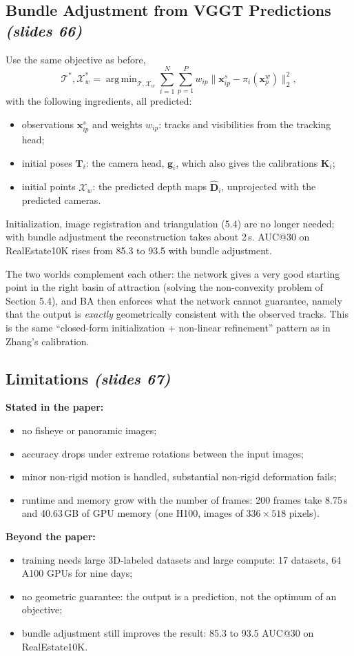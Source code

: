\documentclass[11pt,a4paper]{article}
\newcommand{\slr}[1]{\texorpdfstring{\emph{(slides #1)}}{(slides #1)}}
\DeclareMathOperator*{\argmin}{arg\,min}
\theoremstyle{definition}
\theoremstyle{plain}
\theoremstyle{remark}
\begin{document}
\subsection{Bundle Adjustment from VGGT Predictions \slr{66}}
Use the same objective as before,
\[
\mathcal T^*,\mathcal X_w^*=\argmin_{\mathcal T,\mathcal X_w}\sum_{i=1}^N\sum_{p=1}^P w_{ip}\bigl\lVert\bm x^s_{ip}-\pi_i(\bm x^w_p)\bigr\rVert_2^2,
\]
with the following ingredients, all predicted:
\begin{itemize}
\item observations $\bm x^s_{ip}$ and weights $w_{ip}$: tracks and visibilities from the tracking head;
\item initial poses $\bm T_i$: the camera head, $\hat{\bm g}_i$, which also gives the calibrations $\bm K_i$;
\item initial points $\mathcal X_w$: the predicted depth maps $\hat{\bm D}_i$, unprojected with the predicted cameras.
\end{itemize}
Initialization, image registration and triangulation (5.4) are no longer needed; with bundle adjustment the reconstruction takes about 2\,s. AUC@30 on RealEstate10K rises from 85.3 to 93.5 with bundle adjustment.

\begin{intuition}
The two worlds complement each other: the network gives a very good starting point in the right basin of attraction (solving the non-convexity problem of Section 5.4), and BA then enforces what the network cannot guarantee, namely that the output is \emph{exactly} geometrically consistent with the observed tracks. This is the same ``closed-form initialization + non-linear refinement'' pattern as in Zhang's calibration.
\end{intuition}

\subsection{Limitations \slr{67}}
\textbf{Stated in the paper:}
\begin{itemize}
\item no fisheye or panoramic images;
\item accuracy drops under extreme rotations between the input images;
\item minor non-rigid motion is handled, substantial non-rigid deformation fails;
\item runtime and memory grow with the number of frames: 200 frames take 8.75\,s and 40.63\,GB of GPU memory (one H100, images of $336\times518$ pixels).
\end{itemize}
\textbf{Beyond the paper:}
\begin{itemize}
\item training needs large 3D-labeled datasets and large compute: 17 datasets, 64 A100 GPUs for nine days;
\item no geometric guarantee: the output is a prediction, not the optimum of an objective;
\item bundle adjustment still improves the result: 85.3 to 93.5 AUC@30 on RealEstate10K.
\end{itemize}
\end{document}
